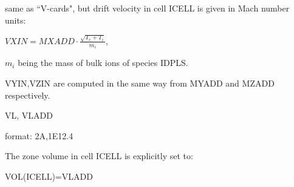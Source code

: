 \begin{description}
        same as ``V-cards", but drift velocity in cell ICELL is given in Mach number
        units:

        $VXIN = MXADD  \cdot \frac{\sqrt{T_e + T_i}}   {m_i} $, 

        $m_i $ being the mass of bulk ions of species IDPLS.

        VYIN,VZIN are computed in the same way from MYADD and MZADD respectively.
  \item[``VL-cards"] VL, VLADD 

        format: 2A,1E12.4 

        The zone volume in cell ICELL is explicitly set to:

        VOL(ICELL)=VLADD
\end{description}

